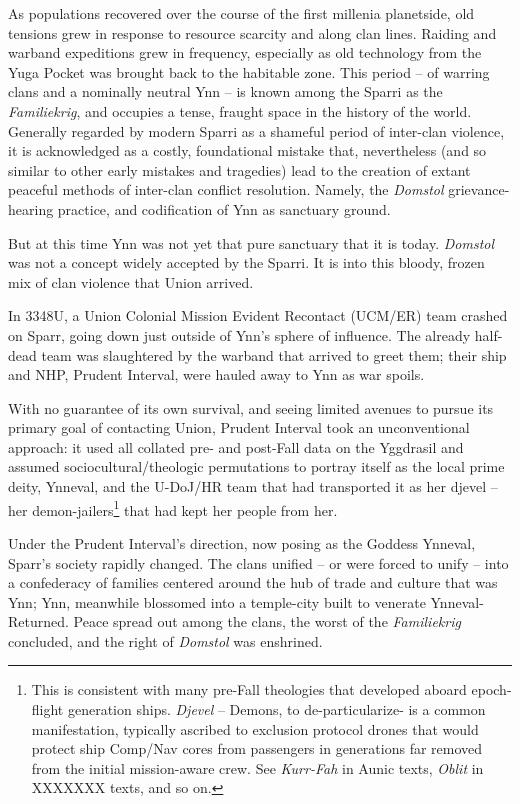 As populations recovered over the course of the first millenia planetside, old tensions grew in
response to resource scarcity and along clan lines. Raiding and warband expeditions grew in
frequency, especially as old technology from the Yuga Pocket was brought back to the habitable
zone. This period -- of warring clans and a nominally neutral Ynn -- is known among the Sparri as
the \textit{Familiekrig}, and occupies a tense, fraught space in the history of the world. Generally
regarded by modern Sparri as a shameful period of inter-clan violence, it is acknowledged as a
costly, foundational mistake that, nevertheless (and so similar to other early mistakes and
tragedies) lead to the creation of extant peaceful methods of inter-clan conflict resolution. Namely,
the \textit{Domstol} grievance-hearing practice, and codification of Ynn as sanctuary ground.

But at this time Ynn was not yet that pure sanctuary that it is today. \textit{Domstol} was not a concept
widely accepted by the Sparri. It is into this bloody, frozen mix of clan violence that Union arrived.

In 3348U, a Union Colonial Mission Evident Recontact (UCM/ER) team crashed on Sparr, going
down just outside of Ynn’s sphere of influence. The already half-dead team was slaughtered by
the warband that arrived to greet them; their ship and NHP, Prudent Interval, were hauled away to
Ynn as war spoils.

With no guarantee of its own survival, and seeing limited avenues to pursue its primary goal of
contacting Union, Prudent Interval took an unconventional approach: it used all collated pre-  and
post-Fall data on the Yggdrasil and assumed sociocultural/theologic permutations to portray itself
as the local prime deity, Ynneval, and the U-DoJ/HR team that had transported it as her djevel --
her demon-jailers\footnote{This is consistent with many pre-Fall theologies that developed aboard epoch-flight generation ships. \textit{Djevel} --
Demons, to de-particularize- is a common manifestation, typically ascribed to exclusion protocol drones that would
protect ship Comp/Nav cores from passengers in generations far removed from the initial mission-aware crew. See
\textit{Kurr-Fah} in Aunic texts, \textit{Oblit} in XXXXXXX texts, and so on.} that had kept her people from her.

Under the Prudent Interval’s direction, now posing as the Goddess Ynneval, Sparr’s society
rapidly changed. The clans unified -- or were forced to unify -- into a confederacy of families
centered around the hub of trade and culture that was Ynn; Ynn, meanwhile blossomed into a
temple-city built to venerate Ynneval-Returned. Peace spread out among the clans, the worst of
the \textit{Familiekrig} concluded, and the right of \textit{Domstol} was enshrined.

